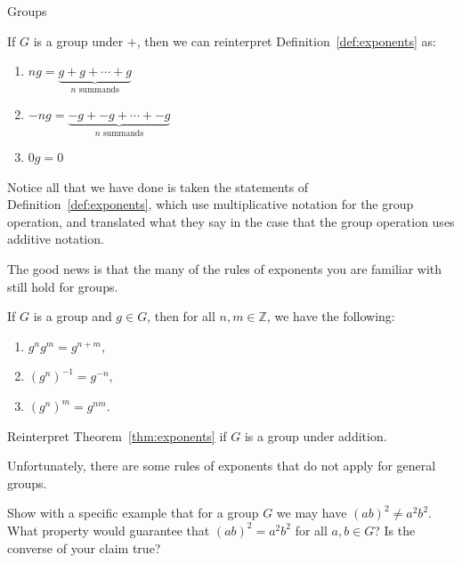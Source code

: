 \begin{section}{Groups}
\begin{remark}
If $G$ is a group under $+$, then we can reinterpret Definition~\ref{def:exponents} as:
\begin{enumerate}[label=\textrm{(\alph*)}]
\item $ng=\underbrace{g+g+\cdots +g}_{n\text{ summands}}$
\item $-ng=\underbrace{-g+-g+\cdots +-g}_{n\text{ summands}}$
\item $0g=0$
\end{enumerate}
Notice all that we have done is taken the statements of Definition~\ref{def:exponents}, which use multiplicative notation for the group operation, and translated what they say in the case that the group operation uses additive notation.
\end{remark}

The good news is that the many of the rules of exponents you are familiar with still hold for groups.

\begin{theorem}\label{thm:exponents}
If $G$ is a group and $g\in G$, then for all $n,m\in\mathbb{Z}$, we have the following:
\begin{enumerate}[label=\textrm{(\alph*)}]
\item $g^ng^m=g^{n+m}$,
\item $(g^n)^{-1}=g^{-n}$,
\item $(g^n)^{m}=g^{nm}$.
\end{enumerate}
\end{theorem}

\begin{problem}
Reinterpret Theorem~\ref{thm:exponents} if $G$ is a group under addition.
\end{problem}

Unfortunately, there are some rules of exponents that do not apply for general groups.

\begin{problem}
Show with a specific example that for a group $G$ we may have $(ab)^2\neq a^2b^2$. What property would guarantee that $(ab)^2=a^2b^2$ for all $a,b\in G$? Is the converse of your claim true?
\end{problem} 

\end{section}


